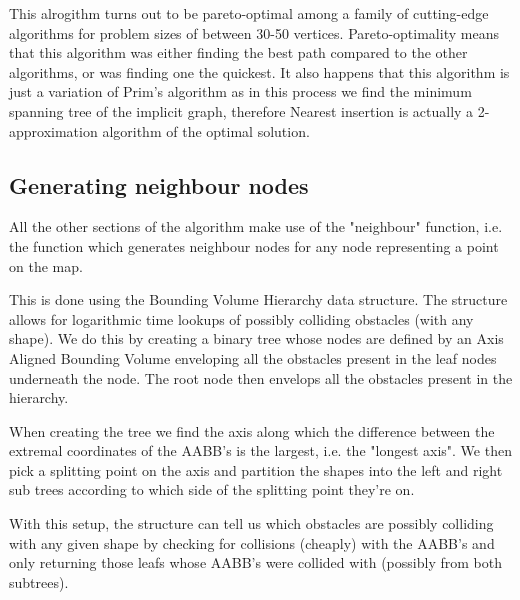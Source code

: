 \documentclass[10pt,a4paper]{article}
\begin{document}
This alrogithm turns out to be pareto-optimal \cite{metric-tsp} among a family of cutting-edge algorithms for problem sizes of between 30-50 vertices.
Pareto-optimality means that this algorithm was either finding the best path compared to the other algorithms, or was finding one the quickest. It also happens that 
this algorithm is just a variation of Prim's algorithm as in this process we find the minimum spanning tree of the implicit graph, therefore Nearest insertion is actually a 
2-approximation algorithm \cite{2-approximation-ni} of the optimal solution.
\subsection{Generating neighbour nodes}
All the other sections of the algorithm make use of the "neighbour" function, i.e. the function which generates neighbour nodes for any node representing 
a point on the map.

This is done using the Bounding Volume Hierarchy data structure. The structure allows for logarithmic time lookups of possibly colliding obstacles (with any shape).
We do this by creating a binary tree whose nodes are defined by an Axis Aligned Bounding Volume enveloping all the obstacles present in the leaf nodes underneath the node.
The root node then envelops all the obstacles present in the hierarchy.
\par
When creating the tree we find the axis along which the difference between the extremal coordinates of the AABB's is the largest, i.e. the "longest axis".
We then pick a splitting point on the axis and partition the shapes into the left and right sub trees according to which side of the splitting point they're on.
\par 
With this setup, the structure can tell us which obstacles are possibly colliding with any given shape by checking for collisions (cheaply) with the AABB's and only returning those leafs whose AABB's were collided with (possibly from both subtrees).
\end{document}
